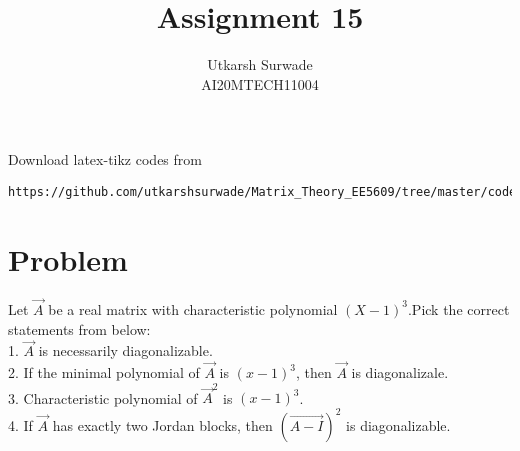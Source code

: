 \documentclass[journal,12pt]{IEEEtran}
\begin{document}
     \def\rightbox#1{\makebox[0in][r]{#1}}
     \def\centbox#1{\makebox[0in]{#1}}
     \def\topbox#1{\raisebox{-\baselineskip}[0in][0in]{#1}}
     \def\midbox#1{\raisebox{-0.5\baselineskip}[0in][0in]{#1}}
\vspace{3cm}
\title{Assignment 15}
\author{Utkarsh Surwade\\AI20MTECH11004}
\maketitle
\bigskip
\renewcommand{\thefigure}{\theenumi}
\renewcommand{\thetable}{\theenumi}
Download latex-tikz codes from 
%
\begin{lstlisting}
https://github.com/utkarshsurwade/Matrix_Theory_EE5609/tree/master/codes
\end{lstlisting}
%
 
\section{\textbf{Problem}}
Let $\vec{A}$ be a real matrix with characteristic polynomial $(X-1)^3$.Pick the correct statements from below:\\
1. $\vec{A}$ is necessarily diagonalizable.\\
2. If the minimal polynomial of $\vec{A}$ is $(x-1)^3$, then $\vec{A}$ is diagonalizale.\\
3. Characteristic polynomial of $\vec{A}^2$ is $(x-1)^3$.\\
4. If $\vec{A}$ has exactly two Jordan blocks, then $(\vec{A-I})^2$ is diagonalizable.
\end{document}
